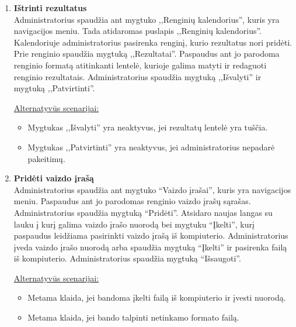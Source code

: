 \documentclass{VUMIFPSkursinis}
\begin{document}
\begin{enumerate} [label = \textbf{U\arabic*.}]
					\underline{Alternatyvūs scenarijai:}
					\begin{itemize}
						\item Metamos klaidos, jei rezultatai yra vedami neteisingai (pvz.: kai į skaitinius laukus bandomos įvesti raidės).
						\item Mygtukas ,,Patvirtinti'' yra neaktyvus, jei administratorius nepadarė pakeitimų.
					\end{itemize}
				
			\item \textbf{Ištrinti rezultatus}   \\
					Administratorius spaudžia ant mygtuko ,,Renginių kalendorius'', kuris yra navigacijos meniu. Tada atidaromas puslapis ,,Renginių kalendorius''. Kalendoriuje administratorius pasirenka renginį, kurio rezultatus nori pridėti. Prie renginio spaudžia mygtuką ,,Rezultatai''. Paspaudus ant jo parodoma renginio formatą atitinkanti lentelė, kurioje galima matyti ir redaguoti renginio rezultatais. Administratorius spaudžia mygtuką ,,Išvalyti'' ir mygtuką ,,Patvirtinti''.
					
					\underline{Alternatyvūs scenarijai:}
					\begin{itemize}
						\item Mygtukas ,,Išvalyti'' yra neaktyvus, jei rezultatų lentelė yra tuščia.
						\item Mygtukas ,,Patvirtinti'' yra neaktyvus, jei administratorius nepadarė pakeitimų.
					\end{itemize}
				
			\item \textbf{Pridėti vaizdo įrašą}   \\
					Administratorius spaudžia ant mygtuko “Vaizdo įrašai”, kuris yra navigacijos meniu. Paspaudus ant jo parodomas renginio vaizdo įrašų sąrašas. Administratorius spaudžia mygtuką “Pridėti”. Atsidaro naujas langas su lauku į kurį galima vaizdo įrašo nuorodą bei mygtuku “Įkelti”, kurį paspaudus leidžiama pasirinkti vaizdo įrašą iš kompiuterio. Administratorius įveda vaizdo įrašo nuorodą arba spaudžia mygtuką “Įkelti” ir pasirenka failą iš kompiuterio. Administratorius spaudžia mygtuką “Išsaugoti”.
					
					\underline{Alternatyvūs scenarijai:}
					\begin{itemize}
						\item Metama klaida, jei bandoma įkelti failą iš kompiuterio ir įvesti nuorodą.
						\item Metama klaida, jei bando talpinti netinkamo formato failą.
					\end{itemize}
				

\end{enumerate}
\end{document}

